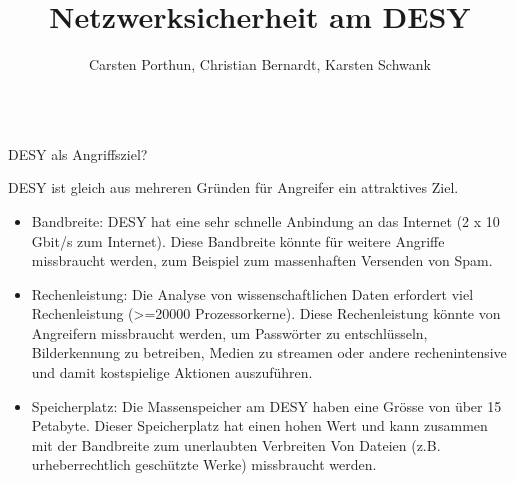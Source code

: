 \documentclass[final]{beamer}
\title{Netzwerksicherheit am DESY} %
\author{Carsten Porthun, Christian Bernardt, Karsten Schwank} %
\begin{document}

\setlength{\belowcaptionskip}{2ex} %
\setlength\belowdisplayshortskip{2ex} %

\begin{frame}[t] %

\begin{columns}[t]
 \begin{column}{0.95\textwidth}
  \begin{alertblock}{DESY als Angriffsziel?}
   \small{
   DESY ist gleich aus mehreren Gründen für Angreifer ein attraktives Ziel. 
   \begin{itemize}
    \item Bandbreite: DESY hat eine sehr schnelle Anbindung an das Internet 
    (2 x 10 Gbit/s zum Internet). Diese Bandbreite könnte für weitere Angriffe missbraucht 
    werden, zum Beispiel zum massenhaften Versenden von Spam.

    \item Rechenleistung: Die Analyse von wissenschaftlichen Daten erfordert 
    viel Rechenleistung (>=20000 Prozessorkerne). Diese Rechenleistung könnte von Angreifern missbraucht werden,
    um Passwörter zu entschlüsseln, Bilderkennung zu betreiben, Medien zu streamen oder 
    andere rechenintensive und damit kostspielige Aktionen auszuführen.

    \item  Speicherplatz: Die Massenspeicher am DESY haben eine Grösse von über 
    15 Petabyte. Dieser Speicherplatz hat einen hohen Wert und kann zusammen 
    mit der Bandbreite zum unerlaubten Verbreiten Von Dateien (z.B. urheberrechtlich 
    geschützte Werke) missbraucht werden.
   \end{itemize}
   }
  \end{alertblock}
 \end{column}
\end{columns}


\begin{columns}[t, totalwidth=\textwidth] %


\end{columns}
\end{frame}
\end{document}
